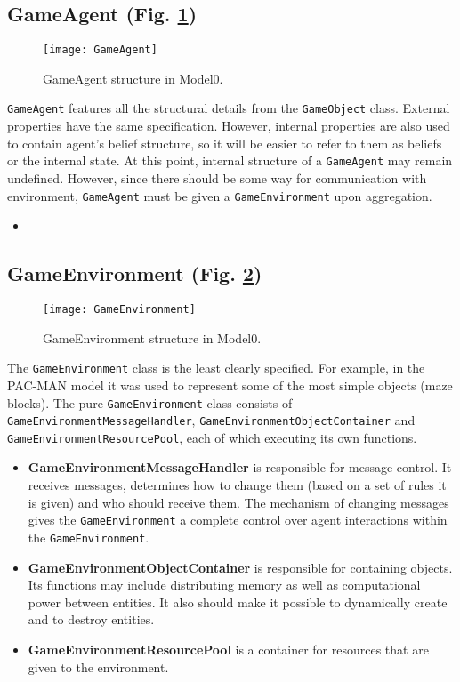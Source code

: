\subsection{GameAgent (Fig. \ref{GameAg})}
  \begin{figure}[p]
    \begin{center}
      \texttt{[image: GameAgent]}
      \caption{GameAgent structure in Model0.}
      \label{GameAg}
     \end{center}
    \end{figure}
\texttt{GameAgent} features all the structural details from the \texttt{GameObject} class.
External properties have the same specification. However, internal properties are also used to contain agent's belief structure, so it will be easier to refer to them as beliefs or the internal state. At this point, internal structure of a \texttt{GameAgent} may remain undefined. However, since there should be some way for communication with environment, \texttt{GameAgent} must be given a \texttt{GameEnvironment} upon aggregation.
\begin{itemize}
\item
\end{itemize}

\subsection{GameEnvironment (Fig. \ref{GameEnv})}
 \begin{figure}[p]
    \begin{center}
      \texttt{[image: GameEnvironment]}
      \caption{GameEnvironment structure in Model0.}
      \label{GameEnv}
     \end{center}
    \end{figure}
The \texttt{GameEnvironment} class is the least clearly specified. For example, in the PAC-MAN model it was used to represent some of the most simple objects (maze blocks). The pure \texttt{GameEnvironment} class consists of \texttt{GameEnvironmentMessageHandler}, \texttt{GameEnvironmentObjectContainer} and \texttt{GameEnvironmentResourcePool}, each of which executing its own functions.
\begin{itemize}
\item \textbf{GameEnvironmentMessageHandler} is responsible for message control. It receives messages, determines how to change them (based on a set of rules it is given) and who should receive them. The mechanism of changing messages gives the \texttt{GameEnvironment} a complete control over agent interactions within the \texttt{GameEnvironment}.
\item \textbf{GameEnvironmentObjectContainer} is responsible for containing objects. Its functions may include distributing memory as well as computational power between entities. It also should make it possible to dynamically create and to destroy entities.
\item \textbf{GameEnvironmentResourcePool} is a container for resources that are given to the environment.
\end{itemize}
